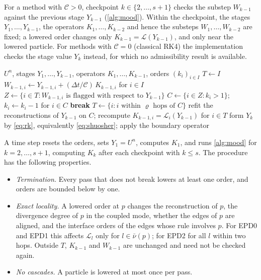 \documentclass[11pt,a4paper]{article}
\theoremstyle{plain}
\theoremstyle{definition}
\theoremstyle{remark}
\numberwithin{equation}{section}
\newcommand{\cnb}{\bar\nu}
\newcommand{\Lop}{\mathcal{L}}
\newcommand{\Csp}{\mathcal{C}}
\begin{document}
For a method with $\Csp>0$, checkpoint $k\in\{2,\dots,s+1\}$ checks the substep $W_{k-1}$ against the previous stage $Y_{k-1}$ (\cref{alg:mood}). Within the checkpoint, the stages $Y_1,\dots,Y_{k-1}$, the operators $K_1,\dots,K_{k-2}$ and hence the substeps $W_1,\dots,W_{k-2}$ are fixed; a lowered order changes only $K_{k-1}=\Lop(Y_{k-1})$, and only near the lowered particle. For methods with $\Csp=0$ (classical RK4) the implementation checks the stage value $Y_k$ instead, for which no admissibility result is available.

\begin{algorithm}[t]
\caption{MOOD checkpoint $k$, $2\le k\le s+1$, for a method with $\Csp>0$ ($Y_{s+1}:=U^{n+1}$).}\label{alg:mood}
\begin{algorithmic}[1]
\Require $U^n$, stages $Y_1,\dots,Y_{k-1}$, operators $K_1,\dots,K_{k-1}$, orders $(k_i)_{i\in I}$
\State $T\gets I$ 
\Loop
  \State $W_{k-1,i}\gets Y_{k-1,i}+(\Delta t/\Csp)\,K_{k-1,i}$ for $i\in I$ 
  \State $Z\gets\{i\in T: W_{k-1,i} \text{ is flagged with respect to } Y_{k-1}\}$
  \State $C\gets\{i\in Z: k_i>1\}$; \quad $k_i\gets k_i-1$ for $i\in C$
   \textbf{break} \EndIf
  \State $T\gets\{i: \text{$i$ within $\varrho$ hops of $C$}\}$ 
  \State refit the reconstructions of $Y_{k-1}$ on $C$; recompute $K_{k-1,i}=\Lop_i(Y_{k-1})$ for $i\in T$
\EndLoop
\State form $Y_k$ by \eqref{eq:rk}, equivalently \eqref{eq:shuosher}; apply the boundary operator
\end{algorithmic}
\end{algorithm}

A time step resets the orders, sets $Y_1=U^n$, computes $K_1$, and runs \cref{alg:mood} for $k=2,\dots,s+1$, computing $K_k$ after each checkpoint with $k\le s$. The procedure has the following properties.
\begin{itemize}
\item \emph{Termination.} Every pass that does not break lowers at least one order, and orders are bounded below by one.
\item \emph{Exact locality.} A lowered order at $p$ changes the reconstruction of $p$, the divergence degree of $p$ in the coupled mode, whether the edges of $p$ are aligned, and the interface orders of the edges whose rule involves $p$. For EPD0 and EPD1 this affects $\Lop_l$ only for $l\in\cnb(p)$; for EPD2 for all $l$ within two hops. Outside $T$, $K_{k-1}$ and $W_{k-1}$ are unchanged and need not be checked again.
\item \emph{No cascades.} A particle is lowered at most once per pass.
\end{itemize}
\end{document}
